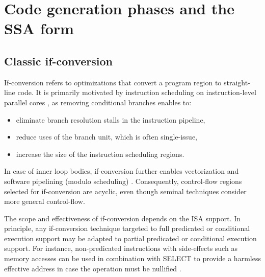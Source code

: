 

\section{Code generation phases and the SSA form}
\label{sec:ssa-codegen-suitability}

\begin{comment}

\subsection{Instruction selection}

Instruction selection (Chapter~\ref{chapter:code_selection}). Unlike
classic techniques that match one IR tree or one DAG at a time, using the SSA
form as input extends the scope of pattern matching to more complex IR graphs,
in particular those resulting from control-flow constructs.

\end{comment}

\subsection{Classic if-conversion}


If-conversion refers to optimizations that convert a program region to
straight-line code.  It is primarily motivated by instruction scheduling on
instruction-level parallel cores \cite{Mahlke:1995:ISCA}, as removing
conditional branches enables to: \begin{itemize}
\item eliminate branch resolution stalls in the instruction pipeline,
\item reduce uses of the branch unit, which is often single-issue,
\item increase the size of the instruction scheduling regions.
\end{itemize} In case of inner loop bodies, if-conversion further enables
vectorization \cite{Allen:1983:POPL} and software pipelining (modulo scheduling)
\cite{Park:1991:TR58}. Consequently, control-flow regions selected for
if-conversion are acyclic, even though seminal techniques
\cite{Allen:1983:POPL,Park:1991:TR58} consider more general control-flow.

The scope and effectiveness of if-conversion depends on the ISA support.  In
principle, any if-conversion technique targeted to full predicated or
conditional execution support may be adapted to partial predicated or
conditional execution support.  For instance, non-predicated instructions with
side-effects such as memory accesses can be used in combination with SELECT to
provide a harmless effective address in case the operation must be nullified
\cite{Mahlke:1995:ISCA}.

